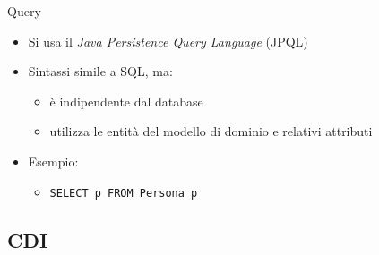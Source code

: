 \begin{frame}{Query}

\begin{itemize}
\item Si usa il \textsl{Java Persistence Query Language} (JPQL)

\vspace{1em}

\item Sintassi simile a SQL, ma:

	\begin{itemize}
	
	\vspace{0.5em}
	
	\item è indipendente dal database
	
	\vspace{0.8em}
	
	\item utilizza le entità del modello di dominio e relativi attributi
	\end{itemize}

\item Esempio:
	\begin{itemize}
	\item \texttt{SELECT p FROM Persona p}
	\end{itemize}

\end{itemize}

\end{frame}


\subsection{CDI}

